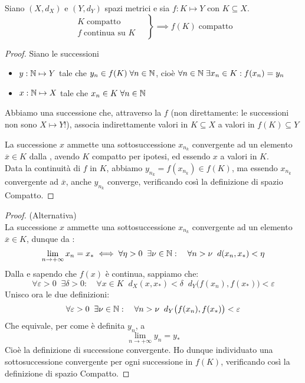 \begin{theorem}
	\label{teo:weier_generale}
	Siano $(X,d_X)$ e $(Y,d_Y)$ spazi metrici e sia $f:K \mapsto Y$ con $K \subseteq X$.
	$$\left.\begin{array}{ll}
		K\;\text{compatto} \\
		f\;\text{continua su } K
		\end{array} \quad\right\} \implies f(K)\;\text{compatto}$$
	\begin{proof}
		Siano le successioni
		\begin{itemize}
			\item $y: \mathbb{N} \mapsto Y$ tale che $y_n \in f(K) \;\forall n \in \mathbb{N}$, cioè $\forall n \in \mathbb{N}\;\exists x_n \in K: f(x_n) = y_n$
			\item $x: \mathbb{N} \mapsto X$ tale che $x_n \in K\;\forall n \in \mathbb{N}$
		\end{itemize}
		\begin{note}
			Abbiamo una successione che, attraverso la $f$ (non direttamente: le successioni non sono $X \mapsto Y$!), associa indirettamente valori in $K \subseteq X$ a valori in $f(K) \subseteq Y$
		\end{note}
		La successione $x$ ammette una sottosuccessione $x_{n_k}$ convergente ad un elemento $\overline{x} \in K$ dalla , avendo $K$ compatto per ipotesi, ed essendo $x$ a valori in $K$.\\
		Data la continuità di $f$ in $K$, abbiamo $y_{n_k} = f(x_{n_k}) \in f(K)$, ma essendo $x_{n_k}$ convergente ad $\overline{x}$, anche $y_{n_k}$ converge, verificando così la definizione di spazio Compatto.
	\end{proof}
	\begin{proof} (Alternativa)\\
		La successione $x$ ammette una sottosuccessione $x_{n_k}$ convergente ad un elemento $\overline{x} \in K$, dunque da :
		$$\lim\limits_{n\rightarrow+\infty}x_n=x_*\iff\forall\eta > 0\;\;\exists\nu\in\mathbb{N}:\quad\forall n>\nu\;\;d(x_n,x_*)<\eta$$
		Dalla  e sapendo che $f(x)$ è continua, sappiamo che:
		$$\forall\varepsilon > 0\;\;\exists\delta > 0:\quad\forall x \in K\;\;d_X (x,x_*)<\delta\;\;d_Y \bigl(f(x_n),f(x_*)\bigr)<\varepsilon$$
		Unisco ora le due definizioni:
		$$\forall \varepsilon > 0\;\;\exists \nu \in \mathbb{N}:\quad \forall n > \nu\;\;d_Y \bigl(f(x_n),f(x_*)\bigr)<\varepsilon$$
		Che equivale, per come è definita $y_n$, a
		$$\lim\limits_{n\rightarrow +\infty}y_n = y_*$$
		Cioè la definizione di successione convergente. Ho dunque individuato una sottosuccessione convergente per ogni successione in $f(K)$, verificando così la definizione di spazio Compatto.
	\end{proof}
\end{theorem}

